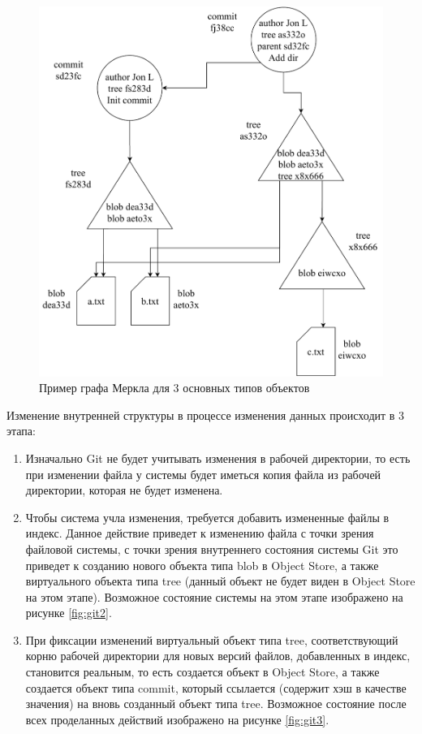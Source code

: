 \begin{figure}[hbtp]
    \centering
    \includegraphics[width=\textwidth]{./img/git-mdag.pdf}
    \caption{Пример графа Меркла для 3 основных типов объектов}
    \label{fig:git1}
\end{figure}

Изменение внутренней структуры в процессе изменения данных происходит в 3 этапа:
\begin{enumerate}
    \item Изначально Git не будет учитывать изменения в рабочей директории, то есть при изменении файла у системы будет иметься копия файла из рабочей директории, которая не будет изменена.
    \item Чтобы система учла изменения, требуется добавить измененные файлы в индекс. Данное действие приведет к изменению файла с точки зрения файловой системы, с точки зрения внутреннего состояния системы Git это приведет к созданию нового объекта типа blob в Object Store, а также виртуального объекта типа tree (данный объект не будет виден в Object Store на этом этапе). Возможное состояние системы на этом этапе изображено на рисунке \ref{fig:git2}.
    \item При фиксации изменений виртуальный объект типа tree, соответствующий корню рабочей директории для новых версий файлов, добавленных в индекс, становится реальным, то есть создается объект в Object Store, а также создается объект типа commit, который ссылается (содержит хэш в качестве значения) на вновь созданный объект типа tree. Возможное состояние после всех проделанных действий изображено на рисунке \ref{fig:git3}.
\end{enumerate}

